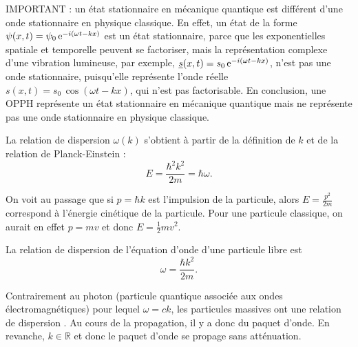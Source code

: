 \documentclass[12pt,fancy]{cours}
\begin{document}
\begin{remarque}
  IMPORTANT : un état stationnaire en mécanique quantique est différent d'une onde stationnaire en physique classique. En effet, un état de la forme $\psi(x,t)=\psi_0\,\mathrm{e}^{-i(\omega t-kx)}$ est un état stationnaire, parce que les exponentielles spatiale et temporelle peuvent se factoriser, mais la représentation complexe d'une vibration lumineuse, par exemple, $\underline{s}(x,t)=s_0\,\mathrm{e}^{-i(\omega t-kx)}$, n'est pas une onde stationnaire, puisqu'elle représente l'onde réelle $s(x,t)=s_0\,\cos(\omega t-kx)$, qui n'est pas factorisable. En conclusion, une OPPH représente un état stationnaire en mécanique quantique mais ne représente pas une onde stationnaire en physique classique.
\end{remarque}

La relation de dispersion $\omega(k)$ s’obtient à partir de la définition de $k$ et de la relation de Planck-Einstein :
\begin{equation}
  E = \frac{\hbar^2 k^2}{2m} = \hbar\omega.
\end{equation}
\begin{remarque}
  On voit au passage que si $p=\hbar k$ est l’impulsion de la particule, alors $E = \frac{p^2}{2m}$ correspond à l’énergie cinétique de la particule. Pour une particule classique, on aurait en effet $p=mv$ et donc $E = \frac{1}{2} m v^2$.
\end{remarque}
\begin{theorem}\label{form:}
  La relation de dispersion de l'équation d'onde d'une particule libre est
  \begin{equation*}
  \omega=\frac{\hbar k^2}{2m}.
\end{equation*}
\end{theorem}
Contrairement au photon (particule quantique associée aux ondes électromagnétiques) pour lequel $\omega=ck$, les particules massives ont une relation de dispersion . Au cours de la propagation, il y a donc  du paquet d'onde. En revanche, $k\in\mathbb{R}$ et donc le paquet d'onde se propage sans atténuation.
\end{document}
